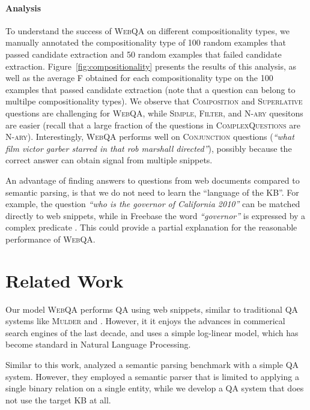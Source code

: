 \documentclass[11pt,a4paper]{article}
\newcommand\nl[1]{{\it``#1''}}
\begin{document}
\paragraph{Analysis} 
To understand the success of \textsc{WebQA} on different compositionality types, we manually annotated the compositionality type of 100 random examples that passed candidate extraction and 50 random examples that failed candidate extraction. Figure~\ref{fig:compositionality} presents the results of this analysis, as well as the average F obtained for each compositionality type on the 100 examples that passed candidate extraction (note that a question can belong to multilpe compositionality types). We observe that \textsc{Composition} and \textsc{Superlative} questions are challenging for \textsc{WebQA}, while \textsc{Simple}, \textsc{Filter}, and \textsc{N-ary} quesitons are easier (recall that a large fraction of the questions in \textsc{ComplexQuestions} are \textsc{N-ary}). Interestingly, \textsc{WebQA} performs well on \textsc{Conjunction} questions (\nl{what film victor garber starred in that rob marshall directed}), possibly because the correct answer can obtain signal from multiple snippets.

An advantage of finding answers to questions from web documents compared to semantic parsing, is that we do not need to learn the ``language of the KB''. For example, the question \nl{who is the governor of California 2010} can be  matched directly to web snippets, while in Freebase \cite{bollacker2008freebase} the word \nl{governor} is expressed by a complex predicate . This could provide a partial explanation for the reasonable performance of \textsc{WebQA}.






 \section{Related Work}
Our model \textsc{WebQA} performs QA using web snippets, similar to traditional QA systems like \textsc{Mulder} \cite{kwok2001scaling} and  \cite{brill2002askmsr}. However, it it enjoys the advances in commerical search engines of the last decade, and uses a simple log-linear model, which has become standard in Natural Language Processing.

Similar to this work,  analyzed a semantic parsing benchmark with a simple QA system. However, they employed a semantic parser that is limited to applying a single binary relation on a single entity, while we develop a QA system that does not use the target KB at all.
\end{document}
